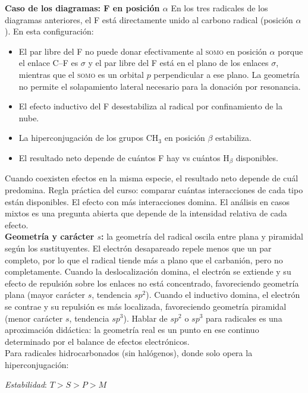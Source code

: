 \textbf{Caso de los diagramas: F en posición $\alpha$} En los tres radicales de los diagramas
anteriores, el F está directamente unido al carbono radical (posición $\alpha$). En esta
configuración:
\begin{itemize}
    \item El par libre del F no puede donar efectivamente al \textsc{somo} en posición
    $\alpha$ porque el enlace C--F es $\sigma$ y el par libre del F está en el plano
    de los enlaces $\sigma$, mientras que el \textsc{somo} es un orbital $p$
    perpendicular a ese plano. La geometría no permite el solapamiento lateral
    necesario para la donación por resonancia.
    \item El efecto inductivo del F desestabiliza al radical por confinamiento de la nube.
    \item La hiperconjugación de los grupos CH$_3$ en posición $\beta$ estabiliza.
    \item El resultado neto depende de cuántos F hay vs cuántos H$_\beta$ disponibles.
\end{itemize}

Cuando coexisten efectos en la misma especie, el resultado neto depende de cuál predomina. Regla
práctica del curso: comparar cuántas interacciones de cada tipo están disponibles. El efecto con
más interacciones domina. El análisis en casos mixtos es una pregunta abierta que depende de la
intensidad relativa de cada efecto. \\

\textbf{Geometría y carácter $s$:} la geometría del radical oscila entre plana y piramidal según
los sustituyentes. El electrón desapareado repele menos que un par completo, por lo que el radical
tiende más a plano que el carbanión, pero no completamente. Cuando la deslocalización domina, el
electrón se extiende y su efecto de repulsión sobre los enlaces no está concentrado, favoreciendo
geometría plana (mayor carácter $s$, tendencia $sp^2$). Cuando el inductivo domina, el electrón
se contrae y su repulsión es más localizada, favoreciendo geometría piramidal (menor carácter $s$,
tendencia $sp^3$). Hablar de $sp^2$ o $sp^3$ para radicales es una aproximación didáctica: la
geometría real es un punto en ese continuo determinado por el balance de efectos electrónicos. \\

Para radicales hidrocarbonados (sin halógenos), donde solo opera la hiperconjugación:

\textit{Estabilidad}: $T > S > P > M$

